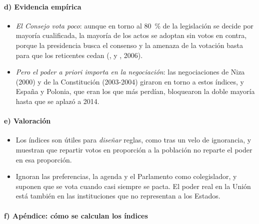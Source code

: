 \documentclass[11pt]{article}
\begin{document}
\paragraph{d) Evidencia empírica}

\begin{itemize}
\item \emph{El Consejo vota poco}: aunque en torno al 80~\% de la legislación se decide por mayoría cualificada\nocite{Consejo2026Votacion}, la mayoría de los actos se adoptan sin votos en contra, porque la presidencia busca el consenso y la amenaza de la votación basta para que los reticentes cedan \nocite{HayesRenshaw2006When}(,  y , 2006).
\item \emph{Pero el poder a priori importa en la negociación}: las negociaciones de Niza (2000) y de la Constitución (2003-2004) giraron en torno a estos índices, y España y Polonia, que eran los que más perdían, bloquearon la doble mayoría hasta que se aplazó a 2014\nocite{BaldwinWidgren2004Winners}.
\end{itemize}

\paragraph{e) Valoración}

\begin{itemize}
\item Los índices son útiles para \emph{diseñar} reglas, como tras un velo de ignorancia, y muestran que repartir votos en proporción a la población no reparte el poder en esa proporción.
\item Ignoran las preferencias, la agenda y el Parlamento como colegislador, y suponen que se vota cuando casi siempre se pacta. El poder real en la Unión está también en las instituciones que no representan a los Estados.
\end{itemize}

\paragraph{f) Apéndice: cómo se calculan los índices}
\end{document}
